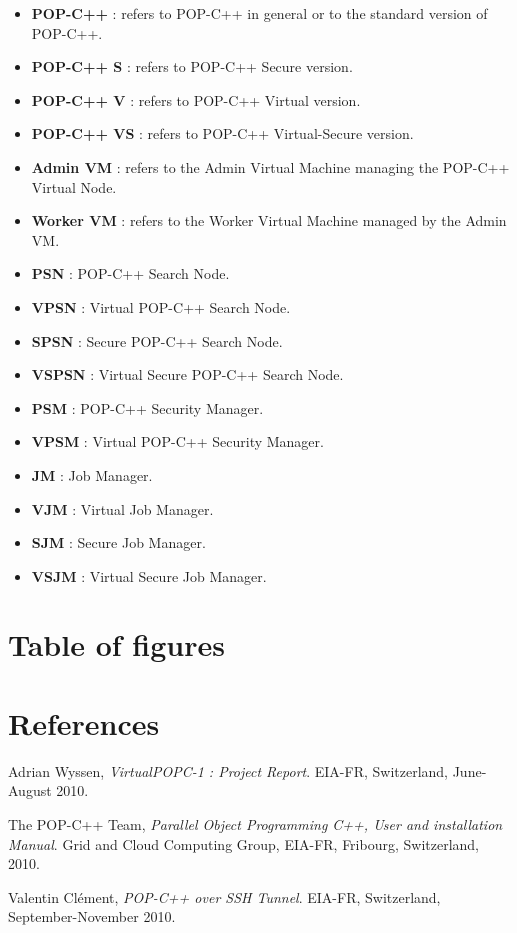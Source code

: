 \documentclass[a4paper, 11pt]{article}
\begin{document}
\begin{itemize}
\item \textbf{POP-C++} : refers to POP-C++ in general or to the standard version of POP-C++.
\item \textbf{POP-C++ S} : refers to POP-C++ Secure version.
\item \textbf{POP-C++ V} : refers to POP-C++ Virtual version.
\item \textbf{POP-C++ VS} : refers to POP-C++ Virtual-Secure version.
\item \textbf{Admin VM} : refers to the Admin Virtual Machine managing the POP-C++ Virtual Node.
\item \textbf{Worker VM} : refers to the Worker Virtual Machine managed by the Admin VM.
\item \textbf{PSN} : POP-C++ Search Node.
\item \textbf{VPSN} : Virtual POP-C++ Search Node.
\item \textbf{SPSN} : Secure POP-C++ Search Node.
\item \textbf{VSPSN} : Virtual Secure POP-C++ Search Node.
\item \textbf{PSM} : POP-C++ Security Manager.
\item \textbf{VPSM} : Virtual POP-C++ Security Manager.
\item \textbf{JM} : Job Manager.
\item \textbf{VJM} : Virtual Job Manager.
\item \textbf{SJM} : Secure Job Manager.
\item \textbf{VSJM} : Virtual Secure Job Manager.
\end{itemize}

\pagebreak
\section{Table of figures}
\listoffigures{}

%
% 
%

\section{References}
\begin{thebibliography}{9}
	Adrian Wyssen,
  	\emph{VirtualPOPC-1 : Project Report}.
	EIA-FR, Switzerland, 
	June-August 2010.
	
	The POP-C++ Team,
  	\emph{Parallel Object Programming C++, User and installation Manual}.
	Grid and Cloud Computing Group, EIA-FR, Fribourg, Switzerland, 
	2010.
	
	Valentin Clément,
	\emph{POP-C++ over SSH Tunnel}.
	EIA-FR, Switzerland,
	September-November 2010.

\end{thebibliography}



\pagebreak
\appendix

\end{document}
